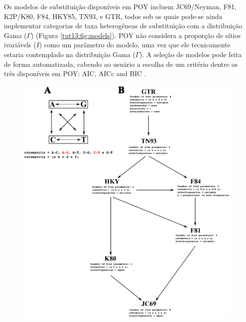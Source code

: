 \begin{refsection}
Os modelos de substituição disponíveis em POY incluem JC69/Neyman, F81, K2P/K80, F84, HKY85, TN93, e GTR, todos sob os quais pode-se ainda implementar categorias de taxa heterogêneas de substituição com a distribuição Gama ($\Gamma$) (Figura \ref{tut13:fig:models}). POY não considera a proporção de sítios ivariávels ($I$) como um parâmetro do modelo, uma vez que ele tecnicamente estaria contemplado na distribuição Gama ($\Gamma$). A seleção de modelos pode feita de forma automatizada, cabendo ao usuário a escolha de um critério dentre os três disponíveis em POY: AIC, AICc and BIC \parencite[para a definição de BIC, veja][]{Darriba_and_Posada_2015}.

  \begin{figure}[h!]
      {\includegraphics[scale=0.8]{figures/tut13/models.eps}}

\end{figure}
\end{refsection}
